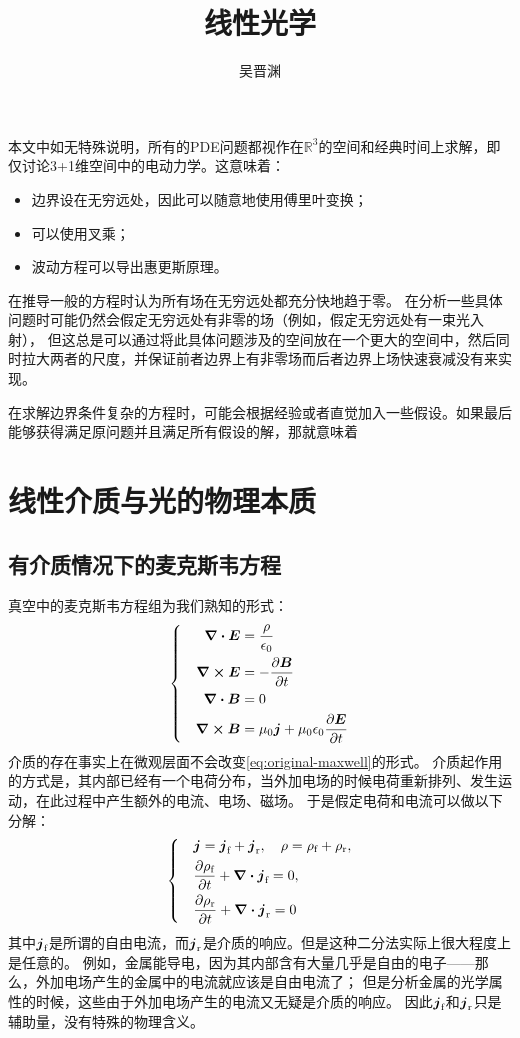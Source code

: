 \documentclass[UTF8, a4paper]{ctexart}
\title{线性光学}
\author{吴晋渊}
\newcommand*{\reals}{\mathbb{R}}
\newenvironment{bigcase}{\left\{\quad\begin{aligned}}{\end{aligned}\right.}
\begin{document}
\maketitle

本文中如无特殊说明，所有的PDE问题都视作在$\reals^3$的空间和经典时间上求解，即仅讨论3+1维空间中的电动力学。这意味着：
\begin{itemize}
    \item 边界设在无穷远处，因此可以随意地使用傅里叶变换；
    \item 可以使用叉乘；
    \item 波动方程可以导出惠更斯原理。
\end{itemize}

在推导一般的方程时认为所有场在无穷远处都充分快地趋于零。
在分析一些具体问题时可能仍然会假定无穷远处有非零的场（例如，假定无穷远处有一束光入射），
但这总是可以通过将此具体问题涉及的空间放在一个更大的空间中，然后同时拉大两者的尺度，并保证前者边界上有非零场而后者边界上场快速衰减没有来实现。

在求解边界条件复杂的方程时，可能会根据经验或者直觉加入一些假设。如果最后能够获得满足原问题并且满足所有假设的解，那就意味着

\section{线性介质与光的物理本质}

\subsection{有介质情况下的麦克斯韦方程}

真空中的麦克斯韦方程组为我们熟知的形式：
\begin{equation}
    \begin{bigcase}
        \div{\vb*{E}} &= \frac{\rho}{\epsilon_0} \\
        \curl{\vb*{E}} &= - \pdv{\vb*{B}}{t} \\
        \div{\vb*{B}} &= 0 \\
        \curl{\vb*{B}} &= \mu_0 \vb*{j} + \mu_0 \epsilon_0 \pdv{\vb*{E}}{t}
    \end{bigcase}
    \label{eq:original-maxwell}
\end{equation}
介质的存在事实上在微观层面不会改变\eqref{eq:original-maxwell}的形式。
介质起作用的方式是，其内部已经有一个电荷分布，当外加电场的时候电荷重新排列、发生运动，在此过程中产生额外的电流、电场、磁场。
于是假定电荷和电流可以做以下分解：
\[
    \begin{bigcase}
        &\vb*{j} = \vb*{j}_\text{f} + \vb*{j}_\text{r}, \quad \rho = \rho_\text{f} + \rho_\text{r}, \\
        &\pdv{\rho_\text{f}}{t} + \div{\vb*{j}_\text{f}} = 0, \\
        &\pdv{\rho_\text{r}}{t} + \div{\vb*{j}_\text{r}} = 0
    \end{bigcase}
\]
其中$\vb*{j}_\text{f}$是所谓的自由电流，而$\vb*{j}_\text{r}$是介质的响应。但是这种二分法实际上很大程度上是任意的。
例如，金属能导电，因为其内部含有大量几乎是自由的电子——那么，外加电场产生的金属中的电流就应该是自由电流了；
但是分析金属的光学属性的时候，这些由于外加电场产生的电流又无疑是介质的响应。
因此$\vb*{j}_\text{f}$和$\vb*{j}_\text{r}$只是辅助量，没有特殊的物理含义。
\end{document}
